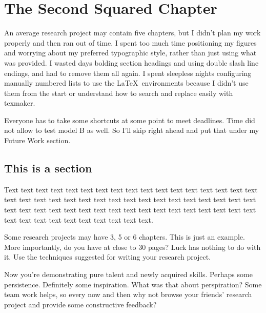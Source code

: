 \chapter{The Second Squared Chapter}

An average research project may contain five chapters, but I didn't plan my work properly
and then ran out of time. I spent too much time positioning my figures and worrying
about my preferred typographic style, rather than just using what was provided.
I wasted days bolding section headings and using double slash line endings, and 
had to remove them all again. I spent sleepless nights configuring manually numbered lists
to use the \LaTeX\ environments because I didn't use them from the start or understand
how to search and replace easily with texmaker.

Everyone has to take some shortcuts
at some point to meet deadlines. Time did not allow to test model 
B as well. So I'll skip right ahead and put that under my Future Work section.


\section{This is a section} 
Text text text text text text text text text text text text text text
text text text text text text text text text text text text text text
text text text text text text text text text text text text text text
text text text text text text text text text text text text text text
text text text text text. 

Some research projects may have 3, 5 or 6 chapters. This is just an example. 
More importantly, do you have at close to 30 pages?  
Luck has nothing to do with it. Use the techniques suggested for
writing your research project.

Now you're demonstrating pure talent and newly acquired skills. 
Perhaps some persistence. Definitely some inspiration. What was that about perspiration? 
Some team work helps, so every now and then why not browse your friends' research project and provide
some constructive feedback?
